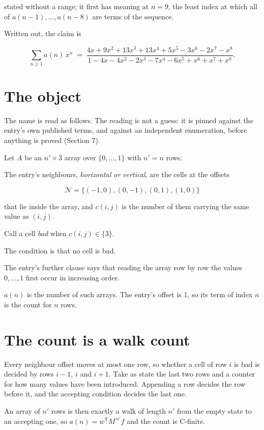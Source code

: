 \documentclass[11pt]{article}
\theoremstyle{definition}
\begin{document}
stated without a range; it first has meaning at $n = 9$, the least index at which all of $a(n-1),\dots,a(n-8)$ are terms of the sequence.

Written out, the claim is

\[\sum_{n \ge 1} a(n)\,x^n \;=\; \frac{4x + 9x^{2} + 13x^{3} + 13x^{4} + 5x^{5} - 3x^{6} - 2x^{7} - x^{8}}{1 - 4x - 4x^{2} - 2x^{3} - 7x^{4} - 6x^{5} + x^{6} + x^{7} + x^{8}}.\]

\section{The object}

The name is read as follows. The reading is not a guess: it is pinned against the entry's own published terms, and against an independent enumeration, before anything is proved (Section 7).

Let $A$ be an $n' \times 3$ array over $\{0,\dots,1\}$ with $n' = n$ rows.

The entry's neighbours, {\itshape horizontal or vertical}, are the cells at the offsets

\[\mathcal{N} = \{(-1,0), (0,-1), (0,1), (1,0)\}\]

that lie inside the array, and $c(i,j)$ is the number of them carrying the same value as $(i,j)$.

Call a cell {\itshape bad} when $c(i,j) \in \{3\}$.

The condition is that no cell is bad.

The entry's further clause says that reading the array row by row the values $0,\dots,1$ first occur in increasing order.

$a(n)$ is the number of such arrays. The entry's offset is 1, so its term of index $n$ is the count for $n$ rows.

\section{The count is a walk count}

Every neighbour offset moves at most one row, so whether a cell of row $i$ is bad is decided by rows $i-1$, $i$ and $i+1$. Take as state the last two rows and a counter for how many values have been introduced. Appending a row decides the row before it, and the accepting condition decides the last one.

An array of $n'$ rows is then exactly a walk of length $n'$ from the empty state to an accepting one, so $a(n) = w^{\mathsf T}M^{\,n'}f$ and the count is C-finite.
\end{document}
